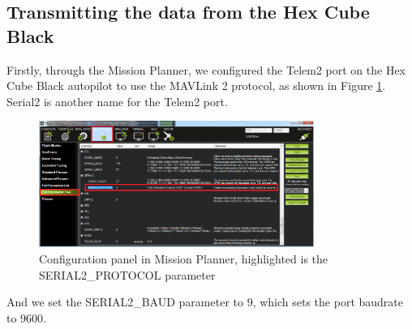 \subsection{Transmitting the data from the Hex Cube Black}
Firstly, through the Mission Planner, we configured the Telem2 port on the Hex Cube Black autopilot to use the MAVLink 2 protocol, as shown in Figure \ref{fig:telem2-protocol}. Serial2 is another name for the Telem2 port.
\begin{figure}[H]
    \centering
    \includegraphics[width=0.8\textwidth]{images/MP-Serial2_protocol.png}
    \caption{Configuration panel in Mission Planner, highlighted is the SERIAL2\_PROTOCOL parameter\cite{ardupilot}}
    \label{fig:telem2-protocol}
\end{figure}
And we set the SERIAL2\_BAUD parameter to 9, which sets the port baudrate to 9600.

